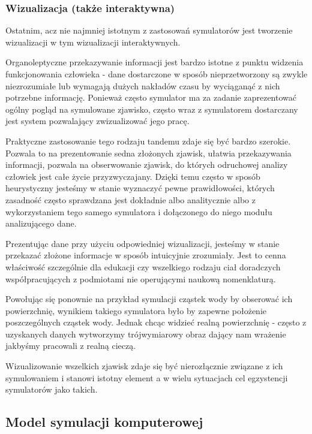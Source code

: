 \subsubsection{Wizualizacja (także interaktywna)}
\par{
Ostatnim, acz nie najmniej istotnym z zastosowań symulatorów jest tworzenie wizualizacji w tym wizualizacji interaktywnych.
}
\par{
Organoleptyczne przekazywanie informacji jest bardzo istotne z punktu widzenia funkcjonowania człowieka - dane dostarczone w sposób nieprzetworzony są zwykle niezrozumiałe lub wymagają dużych nakładów czasu by wyciąganąć z nich potrzebne informację. Ponieważ często symulator ma za zadanie zaprezentować ogólny pogląd na symulowane zjawisko, często wraz z symulatorem dostarczany jest system pozwalający zwizualizować jego pracę.
}
\par{
Praktyczne zastosowanie tego rodzaju tandemu zdaje się być bardzo szerokie. Pozwala to na prezentowanie sedna złożonych zjawisk, ułatwia przekazywania informacji, pozwala na obserwowanie zjawisk, do których odruchowej analizy człowiek jest całe życie przyzwyczajany. Dzięki temu często w sposób heurystyczny jesteśmy w stanie wyznaczyć pewne prawidłowości, których zasadność często sprawdzana jest dokładnie albo analitycznie albo z wykorzystaniem tego samego symulatora i dołączonego do niego modułu analizującego dane.
}
\par{
Prezentując dane przy użyciu odpowiedniej wizualizacji, jesteśmy w stanie przekazać złożone informacje w sposób intuicyjnie zrozumiały. Jest to cenna właściwość szczególnie dla edukacji czy wszelkiego rodzaju ciał doradczych współpracujących z podmiotami nie operującymi naukową nomenklaturą.
}
\par{
Powołując się ponownie na przykład symulacji cząstek wody by obserować ich powierzchnię, wynikiem takiego symulatora było by zapewne położenie poszczególnych cząstek wody. Jednak chcąc widzieć realną powierzchnię - często z uzyskanych danych wytworzymy trójwymiarowy obraz dający nam wrażenie jakbyśmy pracowali z realną cieczą.
}
\par{
Wizualizowanie wszelkich zjawisk zdaje się być nierozłącznie związane z ich symulowaniem i stanowi istotny element a w wielu sytuacjach cel egzystencji symulatorów jako takich.
}

\subsection{Model symulacji komputerowej}
